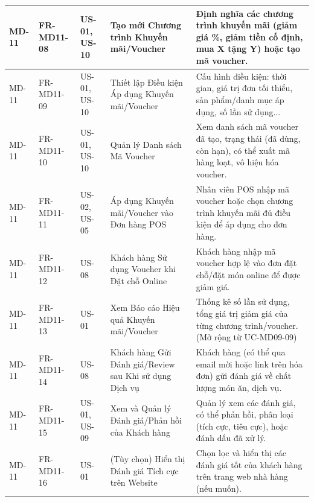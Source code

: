 \begin{longtable}{|m{2cm}|m{2.5cm}|m{2.5cm}|m{4.5cm}|m{4cm}|}
MD-11 & FR-MD11-08 & US-01, US-10 & Tạo mới Chương trình Khuyến mãi/Voucher & Định nghĩa các chương trình khuyến mãi (giảm giá \%, giảm tiền cố định, mua X tặng Y) hoặc tạo mã voucher. \\
\hline
MD-11 & FR-MD11-09 & US-01, US-10 & Thiết lập Điều kiện Áp dụng Khuyến mãi/Voucher & Cấu hình điều kiện: thời gian, giá trị đơn tối thiểu, sản phẩm/danh mục áp dụng, số lần sử dụng... \\
\hline
MD-11 & FR-MD11-10 & US-01, US-10 & Quản lý Danh sách Mã Voucher & Xem danh sách mã voucher đã tạo, trạng thái (đã dùng, còn hạn), có thể xuất mã hàng loạt, vô hiệu hóa voucher. \\
\hline
MD-11 & FR-MD11-11 & US-02, US-05 & Áp dụng Khuyến mãi/Voucher vào Đơn hàng POS & Nhân viên POS nhập mã voucher hoặc chọn chương trình khuyến mãi đủ điều kiện để áp dụng cho đơn hàng. \\
\hline
MD-11 & FR-MD11-12 & US-08 & Khách hàng Sử dụng Voucher khi Đặt chỗ Online & Khách hàng nhập mã voucher hợp lệ vào đơn đặt chỗ/đặt món online để được giảm giá. \\
\hline
MD-11 & FR-MD11-13 & US-01 & Xem Báo cáo Hiệu quả Khuyến mãi/Voucher & Thống kê số lần sử dụng, tổng giá trị giảm giá của từng chương trình/voucher. (Mở rộng từ UC-MD09-09) \\
\hline

MD-11 & FR-MD11-14 & US-08 & Khách hàng Gửi Đánh giá/Review sau Khi sử dụng Dịch vụ & Khách hàng (có thể qua email mời hoặc link trên hóa đơn) gửi đánh giá về chất lượng món ăn, dịch vụ. \\
\hline
MD-11 & FR-MD11-15 & US-01, US-09 & Xem và Quản lý Đánh giá/Phản hồi của Khách hàng & Quản lý xem các đánh giá, có thể phản hồi, phân loại (tích cực, tiêu cực), hoặc đánh dấu đã xử lý. \\
\hline
MD-11 & FR-MD11-16 & US-01 & (Tùy chọn) Hiển thị Đánh giá Tích cực trên Website & Chọn lọc và hiển thị các đánh giá tốt của khách hàng trên trang web nhà hàng (nếu muốn). \\
\hline
\end{longtable}

